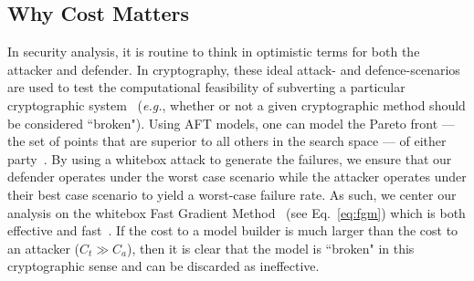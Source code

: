 \documentclass[conference]{IEEEtran}
\begin{document}
\subsection{Why Cost Matters}

In security analysis, it is  routine to think in optimistic terms for both the attacker and defender. 
In cryptography, these ideal attack- and defence-scenarios are used to test the computational feasibility of subverting a particular cryptographic system~\cite{kamal2017study,leurent2020sha} (\textit{e.g.}, whether or not a given cryptographic method should be considered ``broken"). 
Using AFT models, one can model the Pareto front --- the set of points that are superior to all others in the search space --- of either party~\cite{zitzler2008quality}. 
By using a whitebox attack to generate the failures, we ensure that our defender operates under the worst case scenario while the attacker operates under their best case scenario to yield a worst-case failure rate.
As such, we center our analysis on the whitebox Fast Gradient Method~\cite{fgm} (see Eq.~\ref{eq:fgm}) which is both effective and fast~\cite{meyers}. 
If the cost to a model builder is much larger than the cost to an attacker ($C_t \gg C_a$), then it is  clear that the model is ``broken" in this cryptographic sense and can be discarded as ineffective. 
\end{document}
